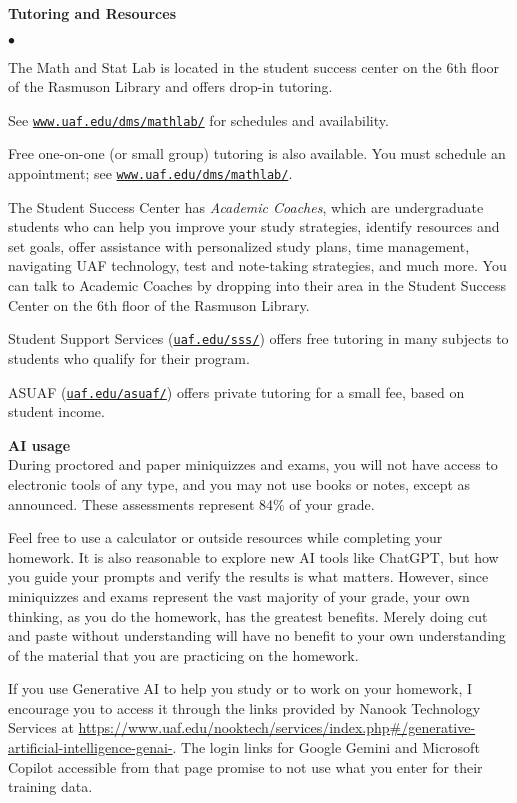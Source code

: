 \documentclass[11pt]{article}
\renewcommand{\emph}[1]{\textsf{\textbf{#1}}}
\newcommand{\localhead}[1]{\par\smallskip\textbf{#1} \smallskip\nobreak\\}%
\def\heading#1{\localhead{\large\emph{#1}}}
\newenvironment{clist}%
{\bgroup\parskip 0pt\begin{list}{$\bullet$}{\partopsep 4pt\topsep 0pt\itemsep -2pt}}%
{\end{list}\egroup}%
\begin{document}
\heading{Tutoring and Resources}
\vskip -30pt\strut
\begin{clist}
    \item The Math and Stat Lab is located in the 
      student success center on the 6th floor of the Rasmuson Library and
      offers drop-in tutoring.

	See 	\href{http://www.uaf.edu/dms/mathlab/}{\texttt{www.uaf.edu/dms/mathlab/}} for schedules and availability.
	\item Free
one-on-one (or small group) tutoring is also available. You must schedule an
appointment; see \href{http://www.uaf.edu/dms/mathlab/}{\texttt{www.uaf.edu/dms/mathlab/}}.
\item The Student Success Center has {\it Academic Coaches}, which are undergraduate students who can help you  improve your study strategies, identify resources and set goals, offer assistance with personalized study plans, time management,  navigating UAF technology, test and note-taking strategies, and much more. You can talk to Academic Coaches by dropping into their area in the Student Success Center on the 6th floor of the Rasmuson Library.
	\item Student Support Services (\href{https://uaf.edu/sss/}{\texttt{uaf.edu/sss/}}) offers free tutoring in many subjects to students who qualify for their program.
	\item ASUAF (\href{https://uaf.edu/asuaf/}{\texttt{uaf.edu/asuaf/}}) offers private tutoring for a small fee, based on student income.
\end{clist}



 \heading{AI usage}
During proctored and paper miniquizzes and exams, you will not have access to electronic tools of any type, and you may not use books or notes, except as announced.  These assessments represent 84\% of your grade.

Feel free to use a calculator or outside resources while completing your homework.  It is also reasonable to explore new AI tools like ChatGPT, but how you guide your prompts and verify the results is what matters. However, since miniquizzes and exams represent the vast majority of your grade, your own thinking, as you do the homework, has the greatest benefits. Merely doing cut and paste without understanding will have no benefit to your own understanding of the material that you are practicing on the homework.

If you use Generative AI to help you study or to work on your homework, I encourage you to access it through the links provided by Nanook Technology Services at \url{https://www.uaf.edu/nooktech/services/index.php#/generative-artificial-intelligence-genai-}. The login links for Google Gemini and Microsoft Copilot accessible from that page promise to not use what you enter for their training data.
\end{document}
